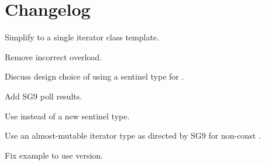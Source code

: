 \section{Changelog}
\begin{revision}
\item Simplify to a single iterator class template.
\item Remove incorrect  overload.
\item Discuss design choice of using a sentinel type for .
\end{revision}

\begin{revision}
\item Add SG9 poll results.
\item Use  instead of a new sentinel type.
\item Use an almost-mutable iterator type as directed by SG9 for
  non-const .
\item Fix  example to use  version.
\end{revision}
